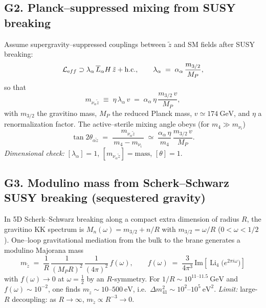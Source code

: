 \documentclass[11pt]{article}
\begin{document}
      \subsection*{G2. Planck--suppressed mixing from SUSY breaking}
          Assume supergravity--suppressed couplings between $\tilde z$ and SM fields after SUSY breaking:
          \begin{equation}
          \mathcal L_{\textrm eff}\supset
          \lambda_\alpha\,\overline{L}_\alpha H\,\tilde z+\text{h.c.},
          \qquad
          \lambda_\alpha \;=\; \alpha_\alpha\,\frac{m_{3/2}}{M_P},
          \end{equation}
          so that
          \begin{equation}
          m_{\nu_\alpha \tilde z}\;\equiv\;\eta\,\lambda_\alpha\,v
          \;=\; \alpha_\alpha\,\eta\,\frac{m_{3/2}\,v}{M_P},
          \end{equation}
          with $m_{3/2}$ the gravitino mass, $M_P$ the reduced Planck mass, $v\simeq 174~\mathrm{GeV}$, and $\eta$ a renormalization factor. The active--sterile mixing angle obeys (for $m_4\gg m_{\nu_i}$)
          \begin{equation}
          \tan 2\theta_{\alpha\tilde z}
          \;=\; \frac{m_{\nu_\alpha\tilde z}}{\,m_4-m_{\nu_i}\,}
          \;\simeq\; \frac{\alpha_\alpha\,\eta}{m_4}\,
          \frac{m_{3/2}\,v}{M_P}.
          \end{equation}
          \textit{Dimensional check:} $[\lambda_\alpha]=1$, $[m_{\nu_\alpha\tilde z}]=\mathrm{mass}$, $[\theta]=1$.

      \subsection*{G3. Modulino mass from Scherk--Schwarz SUSY breaking (sequestered gravity)}
          In 5D Scherk--Schwarz breaking along a compact extra dimension of radius $R$, the gravitino KK spectrum is
          $M_n(\omega)=m_{3/2}+n/R$ with $m_{3/2}=\omega/R$ ($0<\omega<1/2$). One--loop gravitational mediation from the bulk to the brane generates a modulino Majorana mass
          \begin{equation}
          \boxed{\;
          m_{\tilde z}
              \;=\;
              \frac{1}{R}\,\frac{1}{(M_P R)^2}\,\frac{1}{(4\pi)^2}\,f(\omega),
              \qquad
              f(\omega)\;=\;\frac{3}{4\pi^3}\,\mathrm{Im}\!\left[\operatorname{Li}_4\!\big(e^{2\pi i\omega}\big)\right]\; }
          \end{equation}
          with $f(\omega)\to 0$ at $\omega=\tfrac12$ by an $R$-symmetry. For $1/R\sim 10^{11\text{--}11.5}~\mathrm{GeV}$ and
          $f(\omega)\sim 10^{-2}$, one finds $m_{\tilde z}\sim 10$--$500~\mathrm{eV}$,
          i.e.\ $\Delta m^2_{41}\sim 10^{2}$--$10^{5}~\mathrm{eV}^2$.
          \textit{Limit:} large-$R$ decoupling: as $R\!\to\!\infty$, $m_{\tilde z}\propto R^{-3}\to 0$.
\end{document}
